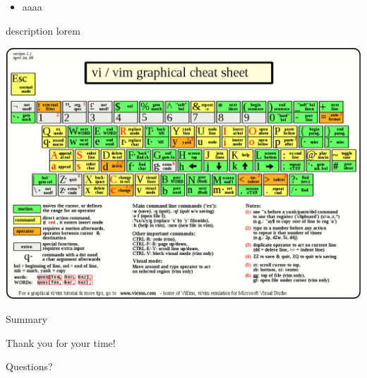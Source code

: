 \documentclass{beamer}
\begin{document}
\begin{frame}
    \begin{itemize}
        \item aaaa
    \end{itemize}
    \begin{description}
        \item description lorem
    \end{description}
\end{frame}

\begin{frame}
    \begin{center}
        \includegraphics[width=1\textwidth]{images/cheat-sheet.png}
    \end{center}
\end{frame}

\begin{frame}{Summary}
\end{frame}

\begin{frame}[plain c]
    \begin{center}
        \huge Thank you for your time!
    \end{center}
    \begin{center}
        Questions?
    \end{center}
\end{frame}
\end{document}
